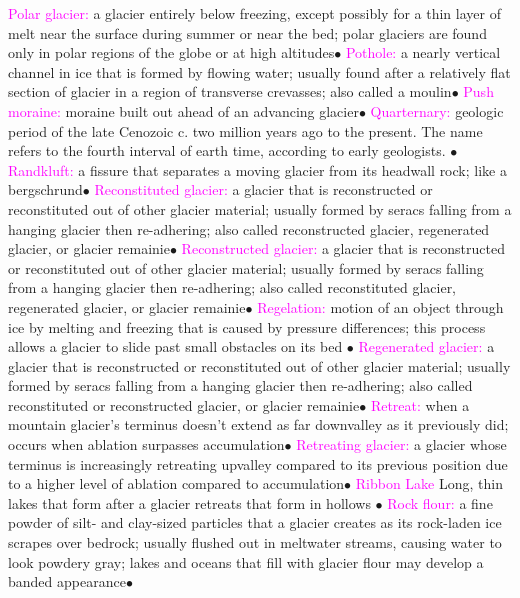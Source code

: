 \documentclass{article}
\newcommand{\ddd}{$\bullet$}
\newcommand{\pink}[1]{\textcolor{magenta}{#1}}
\newcommand{\vocab}[1]{{\pink{#1}}}
\begin{document}
\begin{multicols*}{4}
		\vocab{        Polar glacier: } a glacier entirely below freezing, except possibly for a thin layer of melt near the surface during summer or near the bed; polar glaciers are found only in polar regions of the globe or at high altitudes\ddd
		\vocab{        Pothole: } a nearly vertical channel in ice that is formed by flowing water; usually found after a relatively flat section of glacier in a region of transverse crevasses; also called a moulin\ddd
		\vocab{        Push moraine: } moraine built out ahead of an advancing glacier\ddd
		\vocab{Quarternary: } geologic period of the late Cenozoic c. two million years ago to the present. The name refers to the fourth interval of earth time, according to early geologists.  \ddd
		\vocab{        Randkluft: } a fissure that separates a moving glacier from its headwall rock; like a bergschrund\ddd
		\vocab{        Reconstituted glacier: } a glacier that is reconstructed or reconstituted out of other glacier material; usually formed by seracs falling from a hanging glacier then re-adhering; also called reconstructed glacier, regenerated glacier, or glacier remainie\ddd
		\vocab{        Reconstructed glacier: } a glacier that is reconstructed or reconstituted out of other glacier material; usually formed by seracs falling from a hanging glacier then re-adhering; also called reconstituted glacier, regenerated glacier, or glacier remainie\ddd
		\vocab{ Regelation: } motion of an object through ice by melting and freezing that is caused by pressure differences; this process allows a glacier to slide past small obstacles on its bed \ddd
		\vocab{        Regenerated glacier: } a glacier that is reconstructed or reconstituted out of other glacier material; usually formed by seracs falling from a hanging glacier then re-adhering; also called reconstituted or reconstructed glacier, or glacier remainie\ddd
		\vocab{        Retreat: } when a mountain glacier's terminus doesn't extend as far downvalley as it previously did; occurs when ablation surpasses accumulation\ddd
		\vocab{        Retreating glacier: } a glacier whose terminus is increasingly retreating upvalley compared to its previous position due to a higher level of ablation compared to accumulation\ddd
		\vocab{Ribbon Lake} Long, thin lakes that form after a glacier retreats that form in hollows \ddd
		\vocab{        Rock flour: } a fine powder of silt- and clay-sized particles that a glacier creates as its rock-laden ice scrapes over bedrock; usually flushed out in meltwater streams, causing water to look powdery gray; lakes and oceans that fill with glacier flour may develop a banded appearance\ddd

\end{multicols*}
\end{document}
